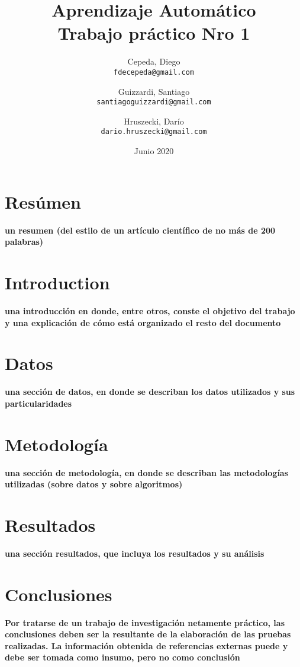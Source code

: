 \documentclass[10pt]{article}
\author{
  Cepeda, Diego\\
  \texttt{fdecepeda@gmail.com}
  \and
  Guizzardi, Santiago\\
  \texttt{santiagoguizzardi@gmail.com}
  \and
  Hruszecki, Darío\\
  \texttt{dario.hruszecki@gmail.com}
}
\title{
Aprendizaje Automático\\
Trabajo práctico Nro 1\\
}
\date{Junio 2020}
\begin{document}



\maketitle

\section{Resúmen}

\textbf{un resumen (del estilo de un artículo científico de no más de 200 palabras)}

\section{Introduction}
\textbf{una introducción en donde, entre otros, conste el objetivo del trabajo y una explicación de cómo está organizado el resto del documento}

\section{Datos}

\textbf{una sección de datos, en donde se describan los datos utilizados y sus particularidades}

\section{Metodología}

\textbf{una sección de metodología, en donde se describan las metodologías utilizadas (sobre datos y sobre algoritmos)}

\section{Resultados}

\textbf{una sección resultados, que incluya los resultados y su análisis}

\section{Conclusiones}

\textbf{Por tratarse de un trabajo de investigación netamente práctico, las conclusiones deben ser la resultante de la elaboración de las pruebas realizadas. La información obtenida de referencias externas puede y debe ser tomada como insumo, pero no como conclusión \cite{Zychlinski:1}}

\newpage
\nocite{*} 

 

\end{document}

